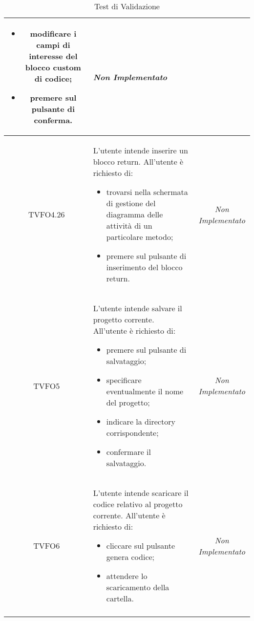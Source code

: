 \begin{longtable}{|c|>{}m{8cm}|c|}
\begin{itemize}
\item modificare i campi di interesse del blocco custom di codice;
\item premere sul pulsante di conferma.
\end{itemize} & \textit{Non Implementato}\\ \hline
\hypertarget{TVFO4.26}{TVFO4.26} & L'utente intende inserire un blocco return.
All'utente è richiesto di:
\begin{itemize}
\item trovarsi nella schermata di gestione del diagramma delle attività di un particolare metodo;
\item premere sul pulsante di inserimento del blocco return.
\end{itemize} & \textit{Non Implementato}\\ \hline
\hypertarget{TVFO5}{TVFO5} & L'utente intende salvare il progetto corrente.
All'utente è richiesto di:
\begin{itemize}
\item premere sul pulsante di salvataggio;
\item specificare eventualmente il nome del progetto;
\item indicare la directory corrispondente;
\item confermare il salvataggio.
\end{itemize} & \textit{Non Implementato}\\ \hline
\hypertarget{TVFO6}{TVFO6} & L'utente intende scaricare il codice relativo al progetto corrente.
All'utente è richiesto di:
\begin{itemize}
\item cliccare sul pulsante genera codice;
\item attendere lo scaricamento della cartella.
\end{itemize} & \textit{Non Implementato}\\ \hline
\caption[Test di Validazione]{Test di Validazione}
\label{tabella:test0}
\end{longtable}
\clearpage

